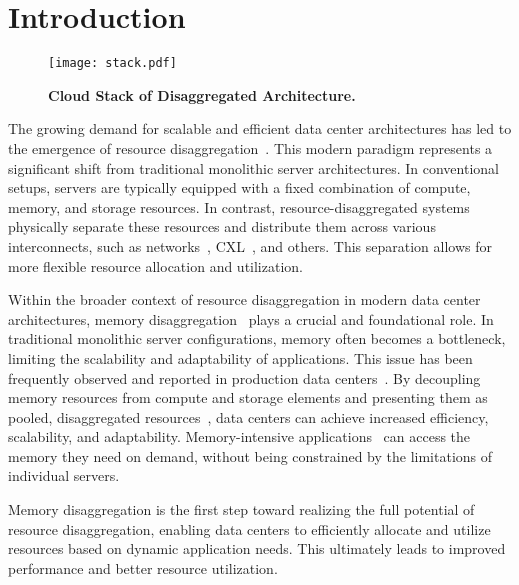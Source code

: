 \chapter{Introduction}
\label{chap:introduction}
\begin{figure}[t]
    \centering
    \texttt{[image: stack.pdf]}
      \caption{\textbf{Cloud Stack of Disaggregated Architecture.}} \vspace{-1.0em}
      \label{fig:stack}
\end{figure}
The growing demand for scalable and efficient data center architectures has led to the emergence of resource disaggregation~\cite{mind, legoos, disagg, memdisagg1, memdisagg2, memdisagg3, memdisagg4, memdisagg5, memdisagg6}. This modern paradigm represents a significant shift from traditional monolithic server architectures. In conventional setups, servers are typically equipped with a fixed combination of compute, memory, and storage resources. In contrast, resource-disaggregated systems physically separate these resources and distribute them across various interconnects, such as networks~\cite{disagg, legoos, mind}, CXL~\cite{cxl, cxlasic}, and others. This separation allows for more flexible resource allocation and utilization.

Within the broader context of resource disaggregation in modern data center architectures, memory disaggregation~\cite{memdisagg1, memdisagg2, memdisagg3, memdisagg4, memdisagg5, memdisagg6} plays a crucial and foundational role. In traditional monolithic server configurations, memory often becomes a bottleneck, limiting the scalability and adaptability of applications. This issue has been frequently observed and reported in production data centers~\cite{memory1, memory2, memory3, memory4, memory5, memory6, memory7, memory8, memory9, memory10}. By decoupling memory resources from compute and storage elements and presenting them as pooled, disaggregated resources~\cite{pool1, pool2}, data centers can achieve increased efficiency, scalability, and adaptability. Memory-intensive applications~\cite{redis, ramcloud, sparkmemory} can access the memory they need on demand, without being constrained by the limitations of individual servers.

Memory disaggregation is the first step toward realizing the full potential of resource disaggregation, enabling data centers to efficiently allocate and utilize resources based on dynamic application needs. This ultimately leads to improved performance and better resource utilization.


